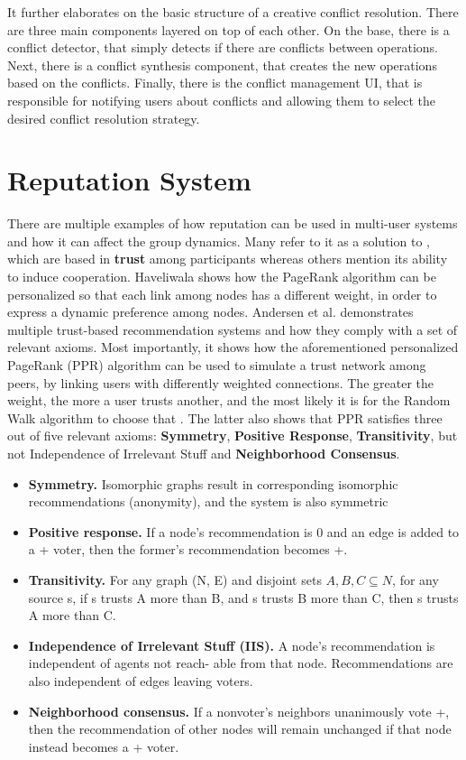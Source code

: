 It further elaborates on the basic structure of a creative conflict resolution. There are three main components layered on top of each other. On the base, there is a conflict detector, that simply detects if there are conflicts between operations. Next, there is a conflict synthesis component, that creates the new operations based on the conflicts. Finally, there is the conflict management UI, that is responsible for notifying users about conflicts and allowing them to select the desired conflict resolution strategy.

\section{Reputation System}\label{sec:rep-sys-sota}

There are multiple examples of how reputation can be used in multi-user systems and how it can affect the group dynamics. Many refer to it as a solution to , which are based in \textbf{trust} among participants whereas others mention its ability to induce cooperation. Haveliwala \cite{Haveliwala2003} shows how the PageRank algorithm can be personalized so that each link among nodes has a different weight, in order to express a dynamic preference among nodes. Andersen et al. \cite{Andersen2008} demonstrates multiple trust-based recommendation systems and how they comply with a set of relevant axioms. Most importantly, it shows how the aforementioned personalized PageRank (PPR) algorithm can be used to simulate a trust network among peers, by linking users with differently weighted connections. The greater the weight, the more a user trusts another, and the most likely it is for the Random Walk algorithm to choose that . The latter also shows that PPR satisfies three out of five relevant axioms: \textbf{Symmetry}, \textbf{Positive Response}, \textbf{Transitivity}, but not Independence of Irrelevant Stuff and \textbf{Neighborhood Consensus}.
\begin{itemize}
    \item \textbf{Symmetry.} Isomorphic graphs result in corresponding isomorphic recommendations (anonymity), and the system is also symmetric
    \item \textbf{Positive response.} If a node’s recommendation is 0 and an edge is added to a + voter, then the former’s recommendation becomes +.
    \item \textbf{Transitivity.} For any graph (N, E) and disjoint sets $ A, B, C \subseteq N $, for any source s, if s trusts A more than B, and s trusts B more than C, then s trusts A more than C.
    \item \textbf{Independence of Irrelevant Stuﬀ (IIS).} A node’s recommendation is independent of agents not reach- able from that node. Recommendations are also independent of edges leaving voters.
    \item \textbf{Neighborhood consensus.} If a nonvoter’s neighbors unanimously vote +, then the recommendation of other nodes will remain unchanged if that node instead becomes a + voter.
\end{itemize}

